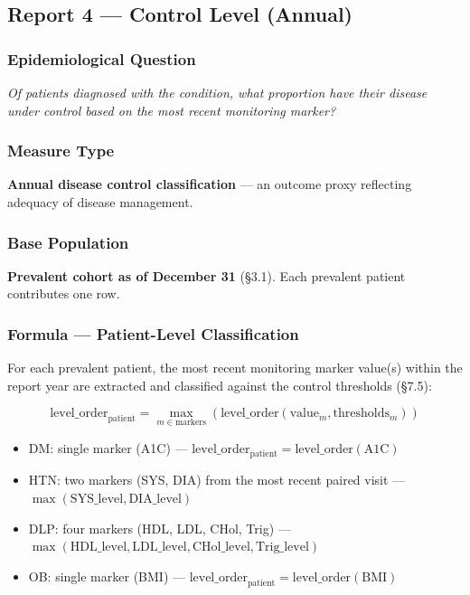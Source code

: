 \documentclass[11pt,a4paper]{article}
\begin{document}
\subsection{Report 4 --- Control Level (Annual)}

\subsubsection{Epidemiological Question}
\textit{Of patients diagnosed with the condition, what proportion have their disease under control based on the most recent monitoring marker?}

\subsubsection{Measure Type}
\textbf{Annual disease control classification} --- an outcome proxy reflecting adequacy of disease management.

\subsubsection{Base Population}
\textbf{Prevalent cohort as of December 31} (§3.1). Each prevalent patient contributes one row.

\subsubsection{Formula --- Patient-Level Classification}

For each prevalent patient, the most recent monitoring marker value(s) within the report year are extracted and classified against the control thresholds (§7.5):

\begin{equation}
\text{level\_order}_{\text{patient}} = \max_{m \in \text{markers}} \left( \text{level\_order}( \text{value}_{m}, \text{thresholds}_{m} ) \right)
\end{equation}

\begin{itemize}[leftmargin=*]
    \item DM: single marker (A1C) --- $\text{level\_order}_{\text{patient}} = \text{level\_order}(\text{A1C})$
    \item HTN: two markers (SYS, DIA) from the most recent paired visit --- $\max(\text{SYS\_level}, \text{DIA\_level})$
    \item DLP: four markers (HDL, LDL, CHol, Trig) --- $\max(\text{HDL\_level}, \text{LDL\_level}, \text{CHol\_level}, \text{Trig\_level})$
    \item OB: single marker (BMI) --- $\text{level\_order}_{\text{patient}} = \text{level\_order}(\text{BMI})$
\end{itemize}
\end{document}
